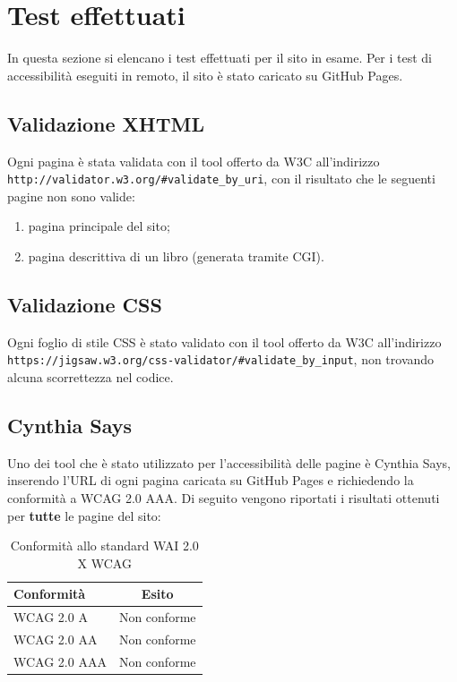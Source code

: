 \section{Test effettuati} %
In questa sezione si elencano i test effettuati per il sito in esame.
Per i test di accessibilità eseguiti in remoto, il sito è stato caricato su
GitHub Pages.

\subsection{Validazione XHTML} %
Ogni pagina è stata validata con il tool offerto da W3C all'indirizzo
\texttt{http://validator.w3.org/\#validate\_by\_uri}, con il risultato che
le seguenti pagine non sono valide:
\begin{enumerate}
\item pagina principale del sito;
\item pagina descrittiva di un libro (generata tramite CGI).
\end{enumerate}

\subsection{Validazione CSS} %
Ogni foglio di stile CSS è stato validato con il tool offerto da W3C
all'indirizzo
\texttt{https://jigsaw.w3.org/css-validator/\#validate\_by\_input}, non
trovando alcuna scorrettezza nel codice.

\subsection{Cynthia Says} %
Uno dei tool che è stato utilizzato per l'accessibilità delle pagine è Cynthia
Says, inserendo l'URL di ogni pagina caricata su GitHub Pages e richiedendo la
conformità a WCAG 2.0 AAA.
Di seguito vengono riportati i risultati ottenuti per \textbf{tutte} le pagine
del sito:

\begin{table}[h!]
\begin{center}
\begin{tabular}{ | l | c | }
  \hline
  Conformità & Esito \\
  \hline
  WCAG 2.0 A & Non conforme \\
  \hline
  WCAG 2.0 AA & Non conforme \\
  \hline
  WCAG 2.0 AAA & Non conforme \\
  \hline
\end{tabular}
\caption{Conformità allo standard WAI 2.0 X WCAG}
\end{center}
\end{table}

